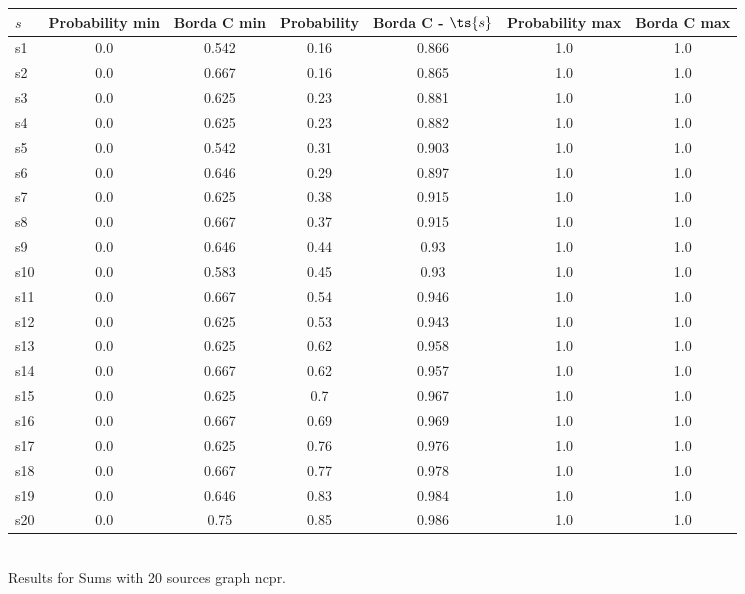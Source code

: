 \documentclass{article}
\begin{document}
\noindent\begin{tabular}{|l|c|c|c|c|c|c|}
\hline
$s$& Probability min & Borda C min & Probability & Borda C - $\ts{s}$ & Probability max & Borda C max\\
\hline
s1 &0.0 & 0.542 & 0.16 & 0.866 & 1.0 & 1.0\\
\hline
s2 &0.0 & 0.667 & 0.16 & 0.865 & 1.0 & 1.0\\
\hline
s3 &0.0 & 0.625 & 0.23 & 0.881 & 1.0 & 1.0\\
\hline
s4 &0.0 & 0.625 & 0.23 & 0.882 & 1.0 & 1.0\\
\hline
s5 &0.0 & 0.542 & 0.31 & 0.903 & 1.0 & 1.0\\
\hline
s6 &0.0 & 0.646 & 0.29 & 0.897 & 1.0 & 1.0\\
\hline
s7 &0.0 & 0.625 & 0.38 & 0.915 & 1.0 & 1.0\\
\hline
s8 &0.0 & 0.667 & 0.37 & 0.915 & 1.0 & 1.0\\
\hline
s9 &0.0 & 0.646 & 0.44 & 0.93 & 1.0 & 1.0\\
\hline
s10 &0.0 & 0.583 & 0.45 & 0.93 & 1.0 & 1.0\\
\hline
s11 &0.0 & 0.667 & 0.54 & 0.946 & 1.0 & 1.0\\
\hline
s12 &0.0 & 0.625 & 0.53 & 0.943 & 1.0 & 1.0\\
\hline
s13 &0.0 & 0.625 & 0.62 & 0.958 & 1.0 & 1.0\\
\hline
s14 &0.0 & 0.667 & 0.62 & 0.957 & 1.0 & 1.0\\
\hline
s15 &0.0 & 0.625 & 0.7 & 0.967 & 1.0 & 1.0\\
\hline
s16 &0.0 & 0.667 & 0.69 & 0.969 & 1.0 & 1.0\\
\hline
s17 &0.0 & 0.625 & 0.76 & 0.976 & 1.0 & 1.0\\
\hline
s18 &0.0 & 0.667 & 0.77 & 0.978 & 1.0 & 1.0\\
\hline
s19 &0.0 & 0.646 & 0.83 & 0.984 & 1.0 & 1.0\\
\hline
s20 &0.0 & 0.75 & 0.85 & 0.986 & 1.0 & 1.0\\
\hline
\end{tabular}\\

\noindent Results for Sums with 20 sources graph ncpr.
\end{document}
